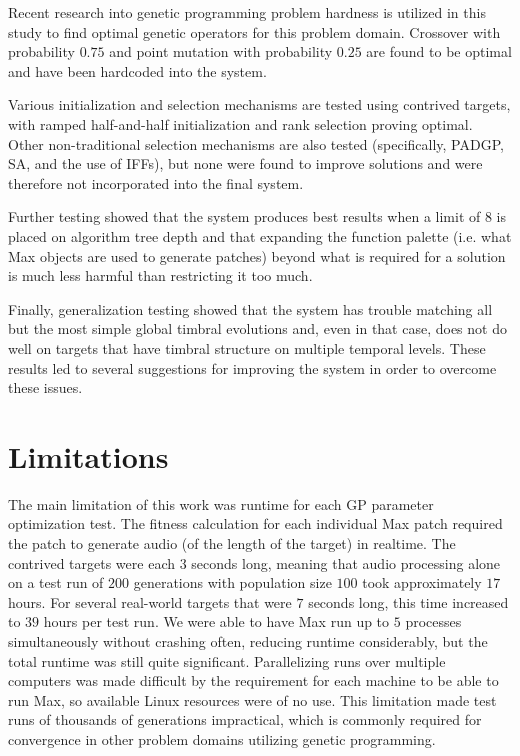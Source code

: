 \documentclass[a4paper,12pt]{report} 	%
\numberwithin{figure}{chapter}
\numberwithin{table}{chapter}
\numberwithin{equation}{chapter}
\begin{document}
\begin{flushleft}
Recent research into genetic programming problem hardness is utilized in this study to find optimal genetic operators for this problem domain. Crossover with probability $0.75$ and point mutation with probability $0.25$ are found to be optimal and have been hardcoded into the system.

Various initialization and selection mechanisms are tested using contrived targets, with ramped half-and-half initialization and rank selection proving optimal. Other non-traditional selection mechanisms are also tested (specifically, PADGP, SA, and the use of IFFs), but none were found to improve solutions and were therefore not incorporated into the final system.

Further testing showed that the system produces best results when a limit of $8$ is placed on algorithm tree depth and that expanding the function palette (i.e. what Max objects are used to generate patches) beyond what is required for a solution is much less harmful than restricting it too much.

Finally, generalization testing showed that the system has trouble matching all but the most simple global timbral evolutions and, even in that case, does not do well on targets that have timbral structure on multiple temporal levels. These results led to several suggestions for improving the system in order to overcome these issues.

\section{Limitations}
The main limitation of this work was runtime for each GP parameter optimization test. The fitness calculation for each individual Max patch required the patch to generate audio (of the length of the target) in realtime. The contrived targets were each $3$ seconds long, meaning that audio processing alone on a test run of $200$ generations with population size $100$ took approximately $17$ hours. For several real-world targets that were $7$ seconds long, this time increased to $39$ hours per test run. We were able to have Max run up to $5$ processes simultaneously without crashing often, reducing runtime considerably, but the total runtime was still quite significant. Parallelizing runs over multiple computers was made difficult by the requirement for each machine to be able to run Max, so available Linux resources were of no use. This limitation made test runs of thousands of generations impractical, which is commonly required for convergence in other problem domains utilizing genetic programming.


\end{flushleft}
\end{document}
